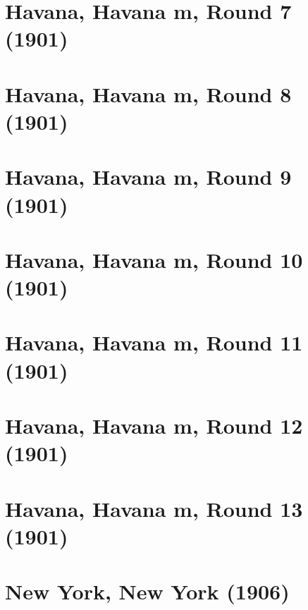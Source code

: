 \documentclass[11pt]{article}
\begin{document}
\clearpage

\section{Havana, Havana m, Round 7 (1901)}


\clearpage

\section{Havana, Havana m, Round 8 (1901)}


\clearpage

\section{Havana, Havana m, Round 9 (1901)}


\clearpage

\section{Havana, Havana m, Round 10 (1901)}


\clearpage

\section{Havana, Havana m, Round 11 (1901)}


\clearpage

\section{Havana, Havana m, Round 12 (1901)}


\clearpage

\section{Havana, Havana m, Round 13 (1901)}


\clearpage

\section{New York, New York (1906)}


\clearpage
\end{document}
